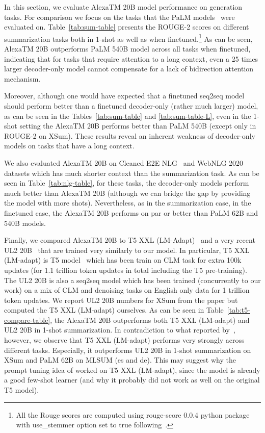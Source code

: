 In this section, we evaluate {AlexaTM 20B} model performance on generation tasks. For comparison we focus on the tasks that the PaLM models~\citep{Chowdhery2022PaLMSL} were evaluated on.  Table~\ref{tab:sum-table} presents the ROUGE-2 scores on different summarization tasks both in 1-shot as well as when finetuned.\footnote{All the Rouge scores are computed using {\ttfamily rouge-score 0.0.4} python package~\citep{Lin2004ROUGEAP} with {\ttfamily use\_stemmer} option set to {\ttfamily true} following~\cite{Gehrmann2021TheGB}.} As can be seen, {AlexaTM 20B} outperforms PaLM 540B model across all tasks when finetuned, indicating that for tasks that require attention to a long context, even a 25 times larger decoder-only model cannot compensate for a lack of bidirection attention mechanism.

Moreover, although one would have expected that a finetuned seq2seq model should perform better than a finetuned decoder-only (rather much larger) model, as can be seen in the Tables~\ref{tab:sum-table} and \ref{tab:sum-table-L}, even in the 1-shot setting the {AlexaTM 20B} performs better than PaLM 540B (except only in ROUGE-2 on XSum). These results reveal an inherent weakness of decoder-only models on tasks that have a long context.

We also evaluated {AlexaTM 20B} on Cleaned E2E NLG~\citep{Novikova2017TheED,Dusek2019SemanticNM} and WebNLG 2020~\citep{Ferreira2020The2B} datasets which has much shorter context than the summarization task. As can be seen in Table~\ref{tab:nlg-table}, for these tasks, the decoder-only models perform much better than {AlexaTM 20B} (although we can bridge the gap by providing the model with more shots). Nevertheless, as in the summarization case, in the finetuned case, the {AlexaTM 20B} performs on par or better than PaLM 62B and 540B models.

Finally, we compared {AlexaTM 20B} to T5 XXL (LM-Adapt)~\citep{Lester2021ThePO} and a very recent UL2 20B~\citep{Tay2022UnifyingLL} that are trained very similarly to our model. In particular, T5 XXL (LM-adapt) is T5 model~\citep{Raffel2020ExploringTL} which has been train on CLM task for extra 100k updates (for 1.1 trillion token updates in total including the T5 pre-training). The UL2 20B is also a seq2seq model which has been trained (concurrently to our work) on a mix of CLM and denoising tasks on English only data for 1 trillion token updates. We report UL2 20B numbers for XSum from the paper but computed the T5 XXL (LM-adapt) ourselves. As can be seen in Table~\ref{tab:t5-compare-table}, the {AlexaTM 20B} outperforms both T5 XXL (LM-adapt) and UL2 20B in 1-shot summarization. In contradiction to what reported by~\cite{Tay2022UnifyingLL}, however, we observe that T5 XXL (LM-adapt) performs very strongly across different tasks. Especially, it outperforms UL2 20B in 1-shot summarization on XSum and PaLM 62B on MLSUM (es and de). This may suggest why the prompt tuning idea of \cite{Lester2021ThePO} worked on T5 XXL (LM-adapt), since the model is already a good few-shot learner (and why it probably did not work as well on the original T5 model). 

